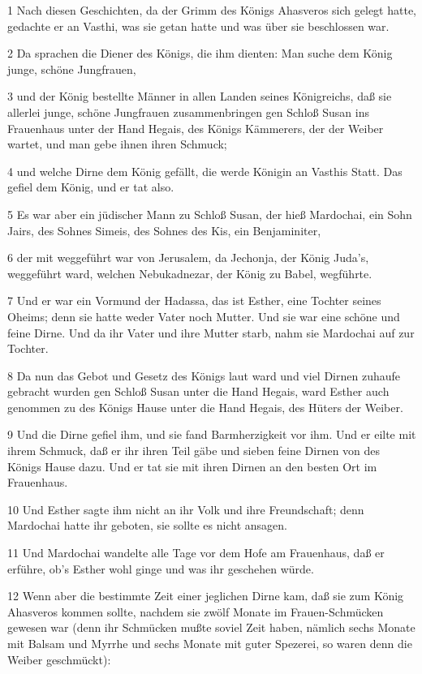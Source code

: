 \par 1 Nach diesen Geschichten, da der Grimm des Königs Ahasveros sich gelegt hatte, gedachte er an Vasthi, was sie getan hatte und was über sie beschlossen war.
\par 2 Da sprachen die Diener des Königs, die ihm dienten: Man suche dem König junge, schöne Jungfrauen,
\par 3 und der König bestellte Männer in allen Landen seines Königreichs, daß sie allerlei junge, schöne Jungfrauen zusammenbringen gen Schloß Susan ins Frauenhaus unter der Hand Hegais, des Königs Kämmerers, der der Weiber wartet, und man gebe ihnen ihren Schmuck;
\par 4 und welche Dirne dem König gefällt, die werde Königin an Vasthis Statt. Das gefiel dem König, und er tat also.
\par 5 Es war aber ein jüdischer Mann zu Schloß Susan, der hieß Mardochai, ein Sohn Jairs, des Sohnes Simeis, des Sohnes des Kis, ein Benjaminiter,
\par 6 der mit weggeführt war von Jerusalem, da Jechonja, der König Juda's, weggeführt ward, welchen Nebukadnezar, der König zu Babel, wegführte.
\par 7 Und er war ein Vormund der Hadassa, das ist Esther, eine Tochter seines Oheims; denn sie hatte weder Vater noch Mutter. Und sie war eine schöne und feine Dirne. Und da ihr Vater und ihre Mutter starb, nahm sie Mardochai auf zur Tochter.
\par 8 Da nun das Gebot und Gesetz des Königs laut ward und viel Dirnen zuhaufe gebracht wurden gen Schloß Susan unter die Hand Hegais, ward Esther auch genommen zu des Königs Hause unter die Hand Hegais, des Hüters der Weiber.
\par 9 Und die Dirne gefiel ihm, und sie fand Barmherzigkeit vor ihm. Und er eilte mit ihrem Schmuck, daß er ihr ihren Teil gäbe und sieben feine Dirnen von des Königs Hause dazu. Und er tat sie mit ihren Dirnen an den besten Ort im Frauenhaus.
\par 10 Und Esther sagte ihm nicht an ihr Volk und ihre Freundschaft; denn Mardochai hatte ihr geboten, sie sollte es nicht ansagen.
\par 11 Und Mardochai wandelte alle Tage vor dem Hofe am Frauenhaus, daß er erführe, ob's Esther wohl ginge und was ihr geschehen würde.
\par 12 Wenn aber die bestimmte Zeit einer jeglichen Dirne kam, daß sie zum König Ahasveros kommen sollte, nachdem sie zwölf Monate im Frauen-Schmücken gewesen war (denn ihr Schmücken mußte soviel Zeit haben, nämlich sechs Monate mit Balsam und Myrrhe und sechs Monate mit guter Spezerei, so waren denn die Weiber geschmückt):
